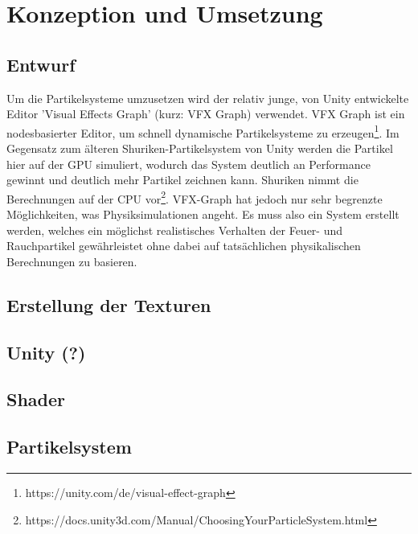 \section{Konzeption und Umsetzung}
\label{sec:4}
\subsection{Entwurf}

Um die Partikelsysteme umzusetzen wird der relativ junge, 
von Unity entwickelte Editor 'Visual Effects Graph' 
(kurz: VFX Graph) verwendet. VFX Graph ist ein nodesbasierter Editor, um schnell
dynamische Partikelsysteme zu erzeugen\footnote{https://unity.com/de/visual-effect-graph}.
Im Gegensatz zum älteren Shuriken-Partikelsystem von Unity werden die Partikel hier auf der GPU
simuliert, wodurch das System deutlich an Performance gewinnt und deutlich mehr Partikel zeichnen kann. 
Shuriken nimmt die Berechnungen auf der CPU vor\footnote{https://docs.unity3d.com/Manual/ChoosingYourParticleSystem.html}. 
VFX-Graph hat jedoch nur sehr begrenzte Möglichkeiten, 
was Physiksimulationen angeht. Es muss also ein System erstellt werden, welches ein möglichst 
realistisches Verhalten der Feuer- und Rauchpartikel gewährleistet ohne dabei auf tatsächlichen
physikalischen Berechnungen zu basieren.  



\subsection{Erstellung der Texturen}
\subsection{Unity (?)}
\subsection{Shader}

\subsection{Partikelsystem}





\newpage
